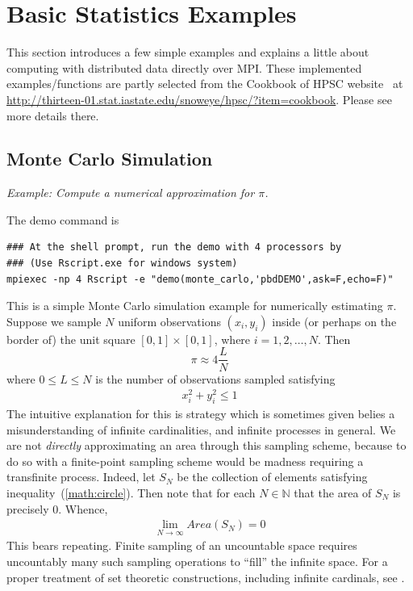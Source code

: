 \chapter[Basic Statistics Examples]{Basic Statistics Examples}
\label{sec:statistics_examples}

This section introduces a few simple examples and explains a little about computing with 
distributed data directly over MPI. 
These implemented examples/functions are partly
selected from the Cookbook of HPSC website~\citep{hpsc2011} at
\url{http://thirteen-01.stat.iastate.edu/snoweye/hpsc/?item=cookbook}.
Please see more details there.





\section[Monte Carlo Simulation]{Monte Carlo Simulation}%
\label{sec:monte_carlo}

\emph{Example:  Compute a numerical approximation for $\pi$.}

The demo command is
\begin{lstlisting}
### At the shell prompt, run the demo with 4 processors by
### (Use Rscript.exe for windows system)
mpiexec -np 4 Rscript -e "demo(monte_carlo,'pbdDEMO',ask=F,echo=F)"
\end{lstlisting}

This is a simple Monte Carlo simulation example for numerically estimating $\pi$.
Suppose we sample $N$ uniform observations $(x_i, y_i)$ inside (or perhaps on the border of) the unit square $[0, 1]\times [0,1]$,
where $i = 1, 2, \ldots, N$.  Then
\begin{equation}
\pi \approx 4\frac{L}{N}
\label{eqn:pi}
\end{equation}
where $0\leq L\leq N$ is the number of observations sampled satisfying
\begin{align}
x_i^2+y_i^2 \leq 1\label{math:circle}
\end{align}
The intuitive explanation for this is strategy which is sometimes given belies a misunderstanding of infinite cardinalities, and infinite processes in general.  We are not \emph{directly} approximating an area through this sampling scheme, because to do so with a finite-point sampling scheme would be madness requiring a transfinite process.  Indeed, let $S_N$ be the collection of elements satisfying inequality~(\ref{math:circle}).  Then note that for each $N\in\mathbb{N}$ that the area of $S_N$ is precisely 0.  Whence,
\begin{align*}
\lim_{N\rightarrow\infty} Area(S_N) = 0
\end{align*}
This bears repeating.  Finite sampling of an uncountable space requires uncountably many such sampling operations to ``fill'' the infinite space.  For a proper treatment of set theoretic constructions, including infinite cardinals, see \citep{kunen}.

